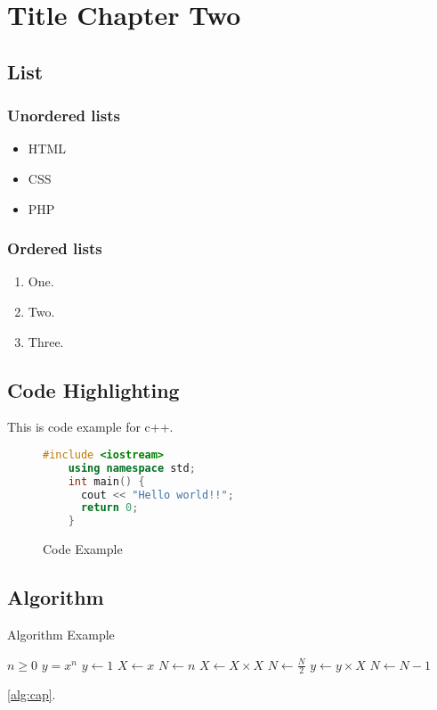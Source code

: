 \chapter{Title Chapter Two}

\section{List}
\subsection{Unordered lists}
\begin{itemize}
  \item HTML
  \item CSS
  \item PHP
\end{itemize}

\subsection{Ordered lists}
\begin{enumerate}
  \item One.
  \item Two.
  \item Three.
\end{enumerate}

\section{Code Highlighting}
This is code example for c++.
\begin{figure}[!h]
  \begin{lstlisting}[language=c++]
    #include <iostream>
    using namespace std;
    int main() {
      cout << "Hello world!!";
      return 0;
    }
    \end{lstlisting}
  \caption{Code Example}
\end{figure}

\section{Algorithm}

\begin{algorithm}
  \caption{Algorithm Example}\label{alg:cap}
  \begin{algorithmic}
    \Require $n \geq 0$
    \Ensure $y = x^n$
    \State $y \gets 1$
    \State $X \gets x$
    \State $N \gets n$
    \State $X \gets X \times X$
    \State $N \gets \frac{N}{2}$  
    \State $y \gets y \times X$
    \State $N \gets N - 1$
    \EndIf
    \EndWhile
  \end{algorithmic}
\end{algorithm}

\lipsum[1-1] \ref{alg:cap}.
